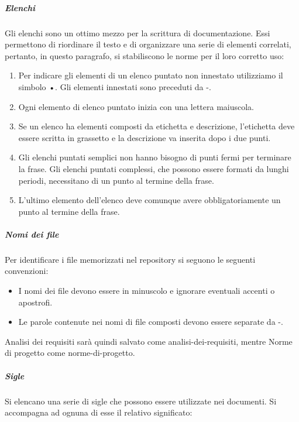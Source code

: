 \documentclass[../norme-di-progetto.tex]{subfiles}
\begin{document}
\subparagraph{Elenchi }%
\label{subp:elenchi}
Gli elenchi sono un ottimo mezzo per la scrittura di documentazione. Essi permettono di riordinare il testo e di organizzare una serie di elementi correlati, pertanto, in questo paragrafo, si stabiliscono le norme per il loro corretto uso:

\begin{enumerate}
  \item Per indicare gli elementi di un elenco puntato non innestato utilizziamo il simbolo •. Gli elementi innestati sono preceduti da -.
  \item Ogni elemento di elenco puntato inizia con una lettera maiuscola.
  \item Se un elenco ha elementi composti da etichetta e descrizione, l'etichetta deve essere scritta in grassetto e la descrizione va inserita dopo i due punti.
  \item Gli elenchi puntati semplici non hanno bisogno di punti fermi per terminare la frase. Gli elenchi puntati complessi, che possono essere formati da lunghi periodi, necessitano di un punto al termine della frase.
  \item L'ultimo elemento dell'elenco deve comunque avere obbligatoriamente un punto al termine della frase.
\end{enumerate}

\subparagraph{Nomi dei file}%
\label{nomi_dei_file}
Per identificare i file memorizzati nel repository si seguono le seguenti convenzioni:

\begin{itemize}
  \item I nomi dei file devono essere in minuscolo e ignorare eventuali accenti o apostrofi.
  \item Le parole contenute nei nomi di file composti devono essere separate da -.
\end{itemize}

Analisi dei requisiti sarà quindi salvato come analisi-dei-requisiti, mentre Norme di progetto come norme-di-progetto.

\subparagraph{Sigle}%
\label{subp:sigle}
Si elencano una serie di sigle che possono essere utilizzate nei documenti. Si accompagna ad ognuna di esse il relativo significato:
\end{document}
